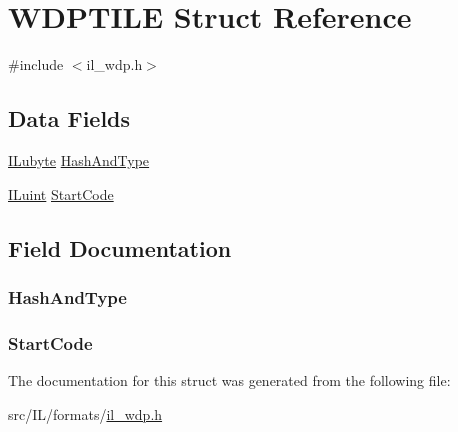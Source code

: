 \hypertarget{struct_w_d_p_t_i_l_e}{\section{W\-D\-P\-T\-I\-L\-E Struct Reference}
\label{struct_w_d_p_t_i_l_e}
}


{\ttfamily \#include $<$il\-\_\-wdp.\-h$>$}

\subsection*{Data Fields}
\begin{DoxyCompactItemize}
\item 
\hyperlink{il_8h_a8d2f04500100a86d1b00e98ab1b15a33}{I\-Lubyte} \hyperlink{struct_w_d_p_t_i_l_e_ade7ff328dc1bb6505bf343ff27522591}{Hash\-And\-Type}
\item 
\hyperlink{il_8h_ac6508d0e9c19e32f32e00d54b5b8cf30}{I\-Luint} \hyperlink{struct_w_d_p_t_i_l_e_a4fe6a5f18b850ecbaf39128cec30ef3d}{Start\-Code}
\end{DoxyCompactItemize}


\subsection{Field Documentation}
\hypertarget{struct_w_d_p_t_i_l_e_ade7ff328dc1bb6505bf343ff27522591}{
\subsubsection[{Hash\-And\-Type}]{ Hash\-And\-Type}}\label{struct_w_d_p_t_i_l_e_ade7ff328dc1bb6505bf343ff27522591}
\hypertarget{struct_w_d_p_t_i_l_e_a4fe6a5f18b850ecbaf39128cec30ef3d}{
\subsubsection[{Start\-Code}]{ Start\-Code}}\label{struct_w_d_p_t_i_l_e_a4fe6a5f18b850ecbaf39128cec30ef3d}


The documentation for this struct was generated from the following file\-:\begin{DoxyCompactItemize}
\item 
src/\-I\-L/formats/\hyperlink{il__wdp_8h}{il\-\_\-wdp.\-h}\end{DoxyCompactItemize}
